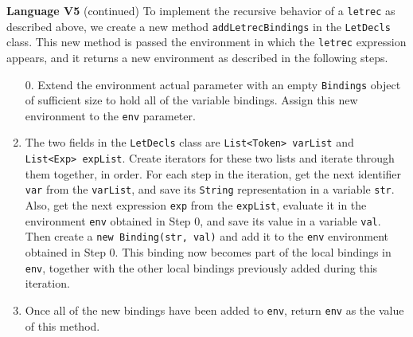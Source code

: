 \begin{minipage}[t]{\sw}
\slidenumber
\LARGE
{\bf Language V5} (continued)\exx
To implement the recursive behavior of a \verb'letrec' as described above,
we create a new method \verb'addLetrecBindings'
in the \verb'LetDecls' class.
This new method is passed the environment
in which the \verb'letrec' expression appears,
and it returns a new environment
as described in the following steps.
\begin{enumerate}
\item [0.]
  Extend the environment actual parameter
  with an empty \verb'Bindings' object of sufficient size
  to hold all of the variable bindings.
  Assign this new environment to the \verb'env' parameter.
\item
  The two fields in the \verb'LetDecls' class are
  \verb'List<Token> varList' and \verb'List<Exp> expList'.
  Create iterators for these two lists
  and iterate through them together, in order.
  For each step in the iteration,
  get the next identifier \verb'var' from the \verb'varList',
  and save its \verb'String' representation in a variable \verb'str'.
  Also, get the next expression \verb'exp' from the \verb'expList',
  evaluate it in the environment \verb'env'
  obtained in Step 0, and save its value in a variable \verb'val'.
  Then create a \verb'new Binding(str, val)'
  and add it to the \verb'env' environment obtained in Step 0.
  This binding now becomes part of the local bindings in \verb'env',
  together with the other local bindings previously added
  during this iteration.
\item
  Once all of the new bindings have been added to \verb'env',
  return \verb'env' as the value of this method.
\end{enumerate}
\end{minipage}
\clearpage

